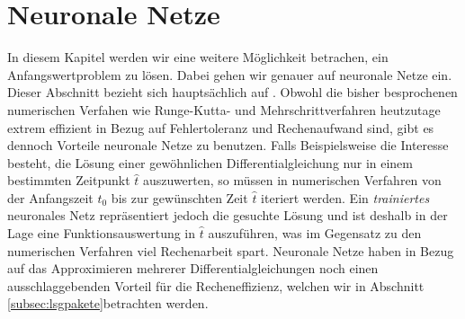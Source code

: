 \section{Neuronale Netze}
\label{sec:neuralnet}
In diesem Kapitel werden wir eine weitere Möglichkeit betrachen, ein Anfangswertproblem zu lösen.
Dabei gehen wir genauer auf neuronale Netze ein. Dieser Abschnitt bezieht sich hauptsächlich auf
\cite{ovidiucalinDeepLearningArchitectures}. Obwohl die bisher besprochenen numerischen Verfahen wie Runge-Kutta- und
Mehrschrittverfahren heutzutage extrem effizient in Bezug auf Fehlertoleranz und Rechenaufwand sind, gibt es dennoch
Vorteile neuronale Netze zu benutzen. Falls Beispielsweise die Interesse besteht, die Lösung einer gewöhnlichen
Differentialgleichung nur in einem bestimmten Zeitpunkt $\hat{t}$ auszuwerten, so müssen in numerischen Verfahren von
der Anfangszeit $t_0$ bis zur gewünschten Zeit $\hat{t}$ iteriert werden. Ein \textit{trainiertes} neuronales Netz
repräsentiert jedoch die gesuchte Lösung und ist deshalb in der Lage eine Funktionsauswertung in $\hat{t}$ auszuführen,
was im Gegensatz zu den numerischen Verfahren viel Rechenarbeit spart. Neuronale Netze haben in Bezug auf das
Approximieren mehrerer Differentialgleichungen noch einen ausschlaggebenden Vorteil für die Recheneffizienz, welchen
wir in Abschnitt \ref{subsec:lsgpakete}betrachten werden.

